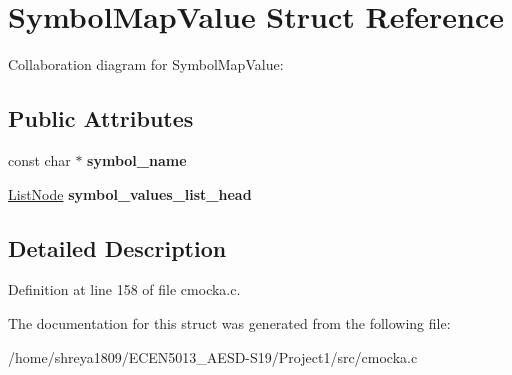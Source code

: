 \hypertarget{structSymbolMapValue}{}\section{Symbol\+Map\+Value Struct Reference}
\label{structSymbolMapValue}


Collaboration diagram for Symbol\+Map\+Value\+:
\subsection*{Public Attributes}
\begin{DoxyCompactItemize}
\item 
\mbox{\label{structSymbolMapValue_a7d187f5727db7dc9352464d3bf803320}} 
const char $\ast$ {\bfseries symbol\+\_\+name}
\item 
\mbox{\label{structSymbolMapValue_aa5dec3b9736433e5ec2a8809a1032b23}} 
\hyperlink{structListNode}{List\+Node} {\bfseries symbol\+\_\+values\+\_\+list\+\_\+head}
\end{DoxyCompactItemize}


\subsection{Detailed Description}


Definition at line 158 of file cmocka.\+c.



The documentation for this struct was generated from the following file\+:\begin{DoxyCompactItemize}
\item 
/home/shreya1809/\+E\+C\+E\+N5013\+\_\+\+A\+E\+S\+D-\/\+S19/\+Project1/src/cmocka.\+c\end{DoxyCompactItemize}
